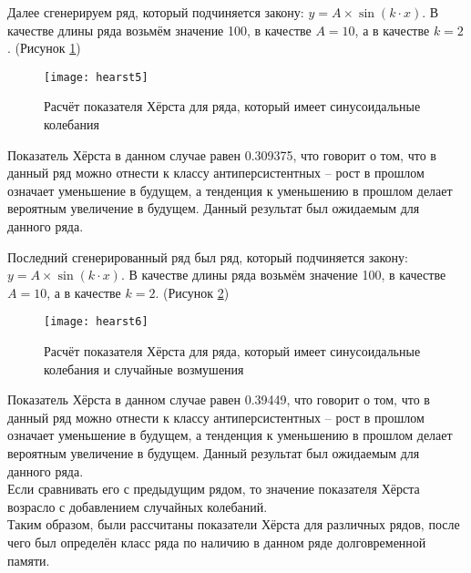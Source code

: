 \newpage

Далее сгенерируем ряд, который подчиняется закону: $y = A \times \sin(k \cdot x)$. В качестве длины ряда возьмём значение 100, в качестве $A = 10$, а в качестве $k = 2$. (Рисунок \ref{fig:hearst5})
\begin{figure}[h]
	\centering \texttt{[image: hearst5]}
	\caption{Расчёт показателя Хёрста для ряда, который имеет синусоидальные колебания}
	\label{fig:hearst5}
\end{figure}

Показатель Хёрста в данном случае равен 0.309375, что говорит о том, что в данный ряд можно отнести к классу антиперсистентных -- рост в прошлом означает уменьшение в будущем, а тенденция к уменьшению в прошлом делает вероятным увеличение в будущем. Данный результат был ожидаемым для данного ряда.\\

\newpage

Последний сгенерированный ряд был ряд, который подчиняется закону: $y = A \times \sin(k \cdot x)$. В качестве длины ряда возьмём значение 100, в качестве $A = 10$, а в качестве $k = 2$. (Рисунок \ref{fig:hearst6})
\begin{figure}[h]
	\centering \texttt{[image: hearst6]}
	\caption{Расчёт показателя Хёрста для ряда, который имеет синусоидальные колебания и случайные возмушения}
	\label{fig:hearst6}
\end{figure}

Показатель Хёрста в данном случае равен 0.39449, что говорит о том, что в данный ряд можно отнести к классу антиперсистентных -- рост в прошлом означает уменьшение в будущем, а тенденция к уменьшению в прошлом делает вероятным увеличение в будущем. Данный результат был ожидаемым для данного ряда.\\

Если сравнивать его с предыдущим рядом, то значение показателя Хёрста возрасло с добавлением случайных колебаний.\\

Таким образом, были рассчитаны показатели Хёрста для различных рядов, после чего был определён класс ряда по наличию в данном ряде долговременной памяти.